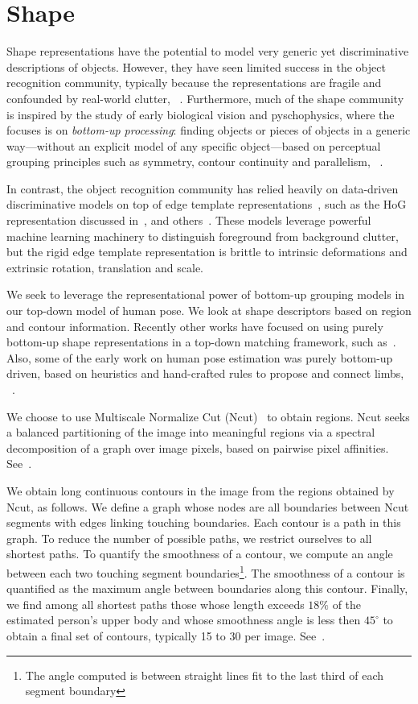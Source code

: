 \section{Shape}\label{sec:shape}  Shape representations have the potential to 
model very generic yet discriminative descriptions of objects.  However, they 
have seen limited success in the object recognition community, typically 
because the representations are fragile and confounded by real-world clutter, 
\eg~\citet{shock-graphs}.  Furthermore, much of the shape community is inspired 
by the study of early biological vision and pyschophysics, where the focuses is 
on {\em bottom-up processing}: finding objects or pieces of objects in a 
generic way---without an explicit model of any specific object---based on 
perceptual grouping principles such as symmetry, contour continuity and
parallelism, \eg~\citet{biederman-geons}.

In contrast, the object recognition community has relied heavily on data-driven 
discriminative models on top of edge template representations~\citep{voc}, such 
as the HoG representation discussed in~, and 
others~\citep{dalal-triggs,viola02,dpm}.  These models leverage powerful 
machine learning machinery to distinguish foreground from background clutter, 
but the rigid edge template representation is brittle to intrinsic deformations 
and extrinsic rotation, translation and scale.

We seek to leverage the representational power of bottom-up grouping models in 
our top-down model of human pose.  We look at shape descriptors based on region 
and contour information.  Recently other works have focused on using purely 
bottom-up shape representations in a top-down matching framework, such 
as~\citet{toshev2010,zhu2008contour,sminch11}.  Also, some of the early work on 
human pose estimation was purely bottom-up driven, based on heuristics and 
hand-crafted rules to propose and connect limbs, \eg~\citet{mori04,praveen07}.

We choose to use Multiscale Normalize Cut (Ncut)~\citep{cour05} to obtain 
regions.  Ncut seeks a balanced partitioning of the image into meaningful 
regions via a spectral decomposition of a graph over image pixels, based on 
pairwise pixel affinities. See~.

We obtain long continuous contours in the image from the regions obtained by 
Ncut, as follows.  We define a graph whose nodes are all boundaries between 
Ncut segments with edges linking touching boundaries. Each contour is a path in 
this graph. To reduce the number of possible paths, we restrict ourselves to 
all shortest paths. To quantify the smoothness of a contour, we compute an 
angle between each two touching segment boundaries\footnote{The angle computed 
is between straight lines fit to the last third of each segment boundary}. The 
smoothness of a contour is quantified as the maximum angle between boundaries 
along this contour. Finally, we find among all shortest paths those whose 
length exceeds $18\%$ of the estimated person's upper body and whose smoothness 
angle is less then $45^\circ$ to obtain a final set of contours, typically 15 
to 30 per image. See~.

